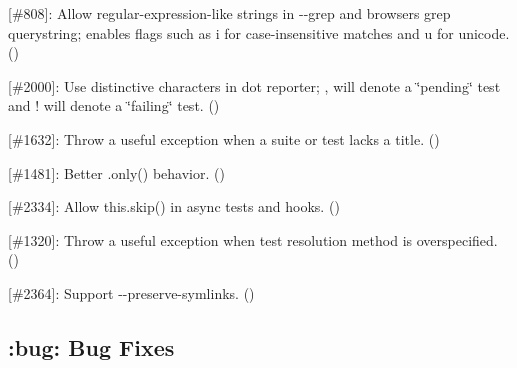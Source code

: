 \begin{DoxyItemize}
\item \mbox{[}\#808\mbox{]}\+: Allow regular-\/expression-\/like strings in {\ttfamily -\/-\/grep} and browser\textquotesingle{}s {\ttfamily grep} querystring; enables flags such as {\ttfamily i} for case-\/insensitive matches and {\ttfamily u} for unicode. (\href{https://github.com/a8m}{\tt })
\item \mbox{[}\#2000\mbox{]}\+: Use distinctive characters in {\ttfamily dot} reporter; {\ttfamily ,} will denote a \char`\"{}pending\char`\"{} test and {\ttfamily !} will denote a \char`\"{}failing\char`\"{} test. (\href{https://github.com/elliottcable}{\tt })
\item \mbox{[}\#1632\mbox{]}\+: Throw a useful exception when a suite or test lacks a title. (\href{https://github.com/a8m}{\tt })
\item \mbox{[}\#1481\mbox{]}\+: Better {\ttfamily .only()} behavior. (\href{https://github.com/a8m}{\tt })
\item \mbox{[}\#2334\mbox{]}\+: Allow {\ttfamily this.\+skip()} in async tests and hooks. (\href{https://github.com/boneskull}{\tt })
\item \mbox{[}\#1320\mbox{]}\+: Throw a useful exception when test resolution method is overspecified. (\href{https://github.com/jugglinmike}{\tt })
\item \mbox{[}\#2364\mbox{]}\+: Support {\ttfamily -\/-\/preserve-\/symlinks}. (\href{https://github.com/rosswarren}{\tt })
\end{DoxyItemize}

\subsection*{\+:bug\+: Bug Fixes}


